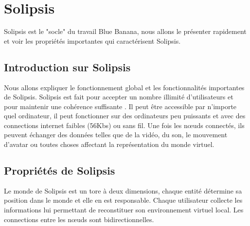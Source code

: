 \section{Solipsis}
	\label{solipsis}
	Solipsis est le "socle" du travail Blue Banana, nous allons le présenter rapidement et voir les propriétés importantes qui caractérisent Solipsis.
	\subsection{Introduction sur Solipsis} 
	\par Nous allons expliquer le fonctionnement global et les fonctionnalités importantes de Solipsis. Solipsis est fait pour accepter un nombre illimité d'utilisateurs et pour maintenir une cohérence suffisante . Il peut être accessible par n'importe quel ordinateur, il peut fonctionner sur des ordinateurs peu puissants et avec des connections internet faibles (56Kbs) ou sans fil. Une fois les nœuds connectés, ils peuvent échanger des données telles que de la vidéo, du son, le mouvement d'avatar ou toutes choses affectant la représentation du monde virtuel. \\
	\subsection{Propriétés de Solipsis}
	Le monde de Solipsis est un tore à deux dimensions, chaque entité détermine sa position dans le monde et elle en est responsable. Chaque utilisateur collecte les informations lui permettant de reconstituer son environnement virtuel local. Les connections entre les nœuds sont bidirectionnelles. 
